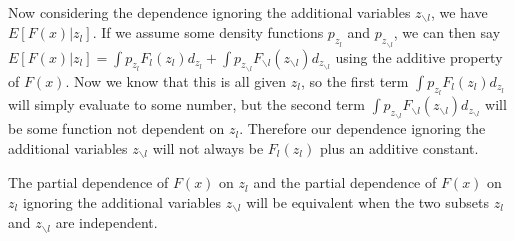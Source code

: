 \documentclass[11pt]{article}
\begin{document}
\vspace{5 mm}
\noindent
Now considering the dependence ignoring the additional variables $z_{\backslash l}$, 
we have $E[F(x)|z_{l}]$. If we assume some density functions $p_{z_{l}}$ and
 $p_{z_{\backslash l}}$, we can then say $E[F(x)|z_{l}] = \int p_{z_{l}}F_{l}(z_{l})
 d_{z_{l}} + \int p_{z_{\backslash l}}F_{\backslash l}(z_{\backslash l})d_{z_{\backslash l}}$
 using the additive property of $F(x)$.  Now we know that this is all given $z_{l}$, so 
 the first term $\int p_{z_{l}}F_{l}(z_{l})d_{z_{l}}$ will simply evaluate to some number,
 but the second term $\int p_{z_{\backslash l}}F_{\backslash l}(z_{\backslash l})
 d_{z_{\backslash l}}$ will be some function not dependent on $z_{l}$. Therefore our
  dependence ignoring the additional variables $z_{\backslash l}$ will not always 
  be $F_{l}(z_{l})$ plus an additive constant.

\vspace{5 mm}
\noindent
 The partial dependence of $F(x)$ on $z_{l}$ and the partial dependence of $F(x)$ on 
 $z_{l}$ ignoring the additional variables $z_{\backslash l}$ will be equivalent
  when the two subsets $z_{l}$ and $z_{\backslash l}$ are independent.
\end{document}
